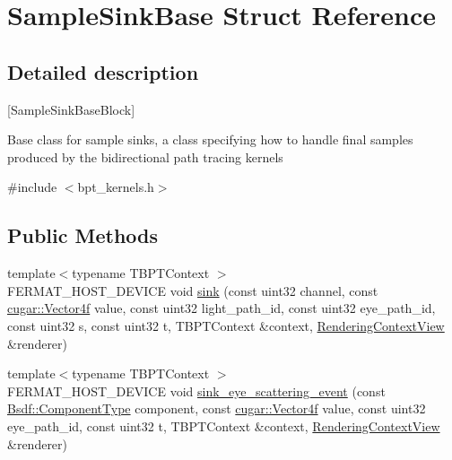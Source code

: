 \hypertarget{struct_sample_sink_base}{}\section{Sample\+Sink\+Base Struct Reference}
\label{struct_sample_sink_base}


\subsection{Detailed description}
\mbox{[}Sample\+Sink\+Base\+Block\mbox{]}

Base class for sample sinks, a class specifying how to handle final samples produced by the bidirectional path tracing kernels

\label{struct_sample_sink_base_SampleSinkAnchor}%
%


{\ttfamily \#include $<$bpt\+\_\+kernels.\+h$>$}

\subsection*{Public Methods}
\begin{DoxyCompactItemize}
\item 
{\footnotesize template$<$typename T\+B\+P\+T\+Context $>$ }\\F\+E\+R\+M\+A\+T\+\_\+\+H\+O\+S\+T\+\_\+\+D\+E\+V\+I\+CE void \hyperlink{struct_sample_sink_base_ab34316c125cab0da36ea2ae41e67f98f}{sink} (const uint32 channel, const \hyperlink{structcugar_1_1_vector}{cugar\+::\+Vector4f} value, const uint32 light\+\_\+path\+\_\+id, const uint32 eye\+\_\+path\+\_\+id, const uint32 s, const uint32 t, T\+B\+P\+T\+Context \&context, \hyperlink{struct_rendering_context_view}{Rendering\+Context\+View} \&renderer)
\item 
{\footnotesize template$<$typename T\+B\+P\+T\+Context $>$ }\\F\+E\+R\+M\+A\+T\+\_\+\+H\+O\+S\+T\+\_\+\+D\+E\+V\+I\+CE void \hyperlink{struct_sample_sink_base_ac96fd485e8196264c43115c68a0bbc25}{sink\+\_\+eye\+\_\+scattering\+\_\+event} (const \hyperlink{struct_bsdf_a5f7db6f81220ed9ee6da109d6eb5b585}{Bsdf\+::\+Component\+Type} component, const \hyperlink{structcugar_1_1_vector}{cugar\+::\+Vector4f} value, const uint32 eye\+\_\+path\+\_\+id, const uint32 t, T\+B\+P\+T\+Context \&context, \hyperlink{struct_rendering_context_view}{Rendering\+Context\+View} \&renderer)
\end{DoxyCompactItemize}



